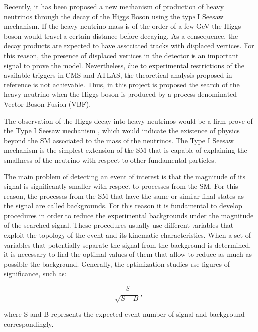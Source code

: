 Recently, it has been proposed a new mechanism of production of heavy neutrinos through the decay of the Higgs Boson \cite{Seesaw Mechanism with displaced vertices} using the type I Seesaw mechanism. If the heavy neutrino mass is of the order of a few GeV the Higgs boson would travel a certain distance before decaying. As a consequence, the decay products are expected to have associated tracks with displaced vertices. For this reason, the presence of displaced vertices in the detector is an important signal to prove the model. Nevertheless, due to experimental restrictions of the available triggers in CMS and ATLAS, the theoretical analysis proposed in reference \cite{Seesaw Mechanism with displace vertices} is not achievable. Thus, in this project is proposed the search of the heavy neutrino when the Higgs boson is produced by a process denominated Vector Boson Fusion (VBF).

The observation of the Higgs decay into heavy neutrinos would be a firm prove of the Type I Seesaw mechanism \cite{Type I Seesaw Mechanism}, which would indicate the existence of physics beyond the SM associated to the mass of the neutrinos. The Type I Seesaw mechanism is the simplest extension of the SM that is capable of explaining the smallness of the neutrino with respect to other fundamental particles. 

The main problem of detecting an event of interest is that the magnitude of its signal is significantly smaller with respect to processes from the SM. For this reason, the processes from the SM that have the same or similar final states as the signal are called backgrounds. For this reason it is fundamental to develop procedures in order to reduce the experimental backgrounds under the magnitude of the searched signal. These procedures usually use different variables that exploit the topology of the event and its kinematic characteristics. When a set of variables that potentially separate the signal from the background is determined, it is necessary to find the optimal values of them that allow to reduce as much as possible the background. Generally, the optimization studies use figures of significance, such as: 

\begin{equation}
    \frac{S}{\sqrt{S+B}},
\end{equation}

where S and B represents the expected event number of signal and background correspondingly.

